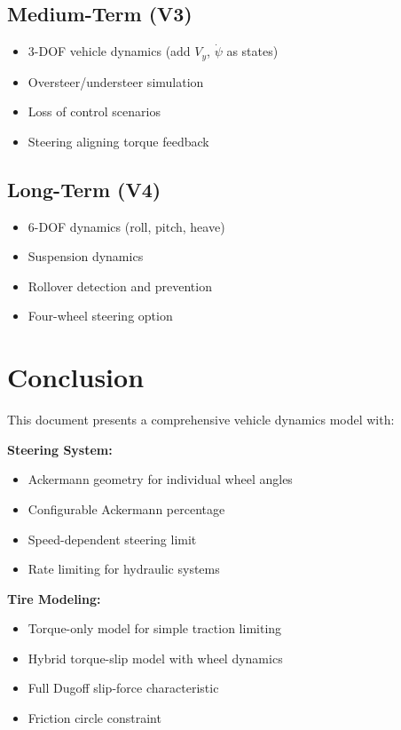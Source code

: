 \documentclass[11pt,a4paper]{article}
\begin{document}
\subsection{Medium-Term (V3)}
\begin{itemize}
    \item 3-DOF vehicle dynamics (add $V_y$, $\dot{\psi}$ as states)
    \item Oversteer/understeer simulation
    \item Loss of control scenarios
    \item Steering aligning torque feedback
\end{itemize}

\subsection{Long-Term (V4)}
\begin{itemize}
    \item 6-DOF dynamics (roll, pitch, heave)
    \item Suspension dynamics
    \item Rollover detection and prevention
    \item Four-wheel steering option
\end{itemize}

\section{Conclusion}

This document presents a comprehensive vehicle dynamics model with:

\textbf{Steering System:}
\begin{itemize}
    \item Ackermann geometry for individual wheel angles
    \item Configurable Ackermann percentage
    \item Speed-dependent steering limit
    \item Rate limiting for hydraulic systems
\end{itemize}

\textbf{Tire Modeling:}
\begin{itemize}
    \item Torque-only model for simple traction limiting
    \item Hybrid torque-slip model with wheel dynamics
    \item Full Dugoff slip-force characteristic
    \item Friction circle constraint
\end{itemize}
\end{document}
